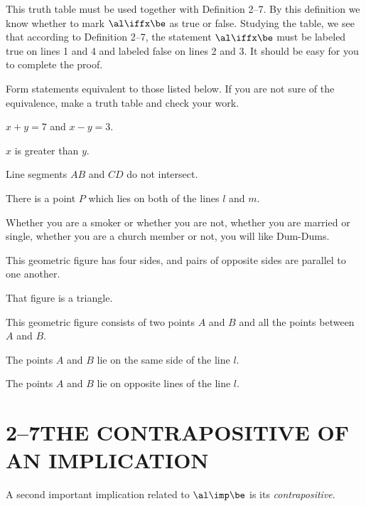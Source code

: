 \documentclass[11pt]{book}
\theoremstyle{bkplain}
\theoremstyle{XIplainnote}
\theoremstyle{bkplain}
\theoremstyle{bkplain}
\begin{document}
This truth table must be used together with Definition 2--7. By this definition we
know whether to mark $\al \iffx \be$ as true or false. Studying the table, we see
that according to Definition 2--7, the statement $\al \iffx \be$ must be labeled
true on lines 1 and 4 and labeled false on lines 2 and 3. It should be easy for
you to complete the proof.


Form statements equivalent to those listed below. If you are not sure of the
equivalence, make a truth table and check your work.

\begin{exercisecols}
\begin{exlist}
\item $x + y = 7$ and $x - y = 3$.
\item $x$ is greater than $y$.
\item Line segments $AB$ and $CD$ do not intersect.
\item There is a point $P$ which lies on both of the lines $l$ and $m$.
\item Whether you are a smoker or whether you are not, whether you are married or
      single, whether you are a church member or not, you will like Dum-Dums.
\item This geometric figure has four sides, and pairs of opposite sides are
      parallel to one another.
\item That figure is a triangle.
\item This geometric figure consists of two points $A$ and $B$ and all the points
      between $A$ and $B$.
\item The points $A$ and $B$ lie on the same side of the line $l$.
\item The points $A$ and $B$ lie on opposite lines of the line $l$.
\end{exlist}
\end{exercisecols}

\section*{2--7\quad THE CONTRAPOSITIVE OF AN IMPLICATION}

A second important implication related to $\al \imp \be$ is its
\emph{contrapositive}.
\end{document}
